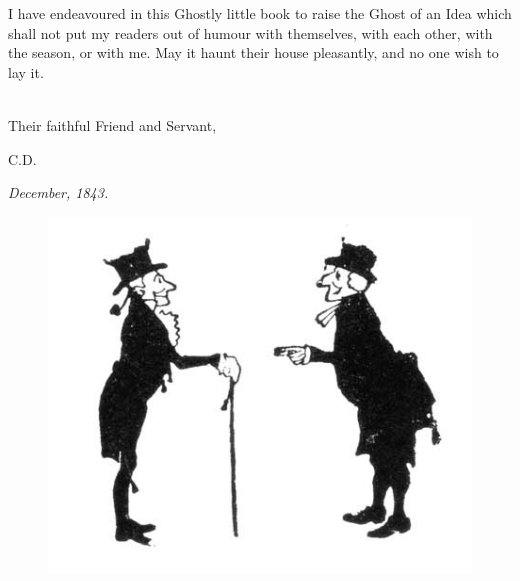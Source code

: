 

\lettrine[lines=4]{I}{} have endeavoured in this Ghostly little book to raise the Ghost of an Idea which shall not put my readers out of humour with themselves, with each other, with the season, or with me. May it haunt their house pleasantly, and no one wish to lay it.

~\\

Their faithful Friend and Servant,

\begin{flushright}
\textsc{C.D.}
\end{flushright}

\textit{December, 1843.}

\vfill
\begin{figure}[h]
\centering
\includegraphics[width=.5\textwidth]{gs007}
\caption[Tailpiece to Preface]{}
\end{figure}